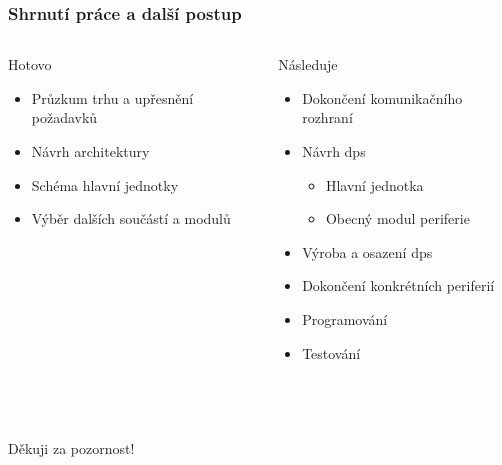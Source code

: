 \documentclass[%
  12pt,       				%
	t,                  %
	aspectratio=1610,   %
	unicode,						%
]{beamer}				    	%
\begin{document}
\begin{frame}[fragile]
	\frametitle{Shrnutí práce a další postup}

	\begin{columns}[T] 								%
		\begin{column}{0.5\textwidth}		%
			\begin{block}{Hotovo}
				\begin{itemize}
					\item Průzkum trhu a upřesnění požadavků
					\item Návrh architektury 
					\item Schéma hlavní jednotky
					\item Výběr dalších součástí a modulů 
				\end{itemize}
			\end{block}
		\end{column}
		\begin{column}{0.5\textwidth}		%
			\begin{alertblock}{Následuje}
				\begin{itemize}
					\item Dokončení komunikačního rozhraní
					\item Návrh \acs{dps}
					\begin{itemize}
						\item Hlavní jednotka
						\item Obecný modul periferie
					\end{itemize}
					\item Výroba a osazení \acs{dps} 
					\item Dokončení konkrétních periferií
					\item Programování
					\item Testování
				\end{itemize}
			\end{alertblock}
		\end{column}
	\end{columns}											%
\end{frame}



\begin{frame}[c] 
	\frametitle{\mbox{ }}
	\begin{center}
		{\Huge Děkuji za pozornost!}
	\end{center}
\end{frame}
\end{document}

